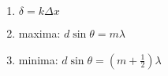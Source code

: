 

\vspace*{\fill}
\centering

\begin{enumerate}
    \item $\delta = k\Delta x$
    \item maxima: $d\sin{\theta} = m\lambda$
    \item minima: $\displaystyle d\sin{\theta} = (m+\frac{1}{2})\lambda$
\end{enumerate}

\centering
\vspace*{\fill}


